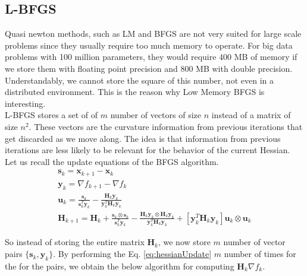 \documentclass[a4paper,10pt]{article}
\theoremstyle{definition}
\begin{document}
\subsection{L-BFGS}
Quasi newton methods, such as LM and BFGS are not very suited for large scale problems since they usually require too much memory to operate. For big data problems with 100 million parameters, they would require 400 MB of memory if we store them with floating point precision and 800 MB with double precision. Understandably, we cannot store the square of this number, not even in a distributed environment. This is the reason why Low Memory BFGS is interesting. \\

L-BFGS stores a set of of $m$ number of vectors of size $n$ instead of a matrix of size $n^2$. These vectors are the curvature information from previous iterations that get discarded as we move along. The idea is that information from previous iterations are less likely to be relevant for the behavior of the current Hessian. Let us recall the update equations of the BFGS algorithm.
\begin{gather}
	\pmb{s}_k = \pmb{x}_{k+1} - \pmb{x}_{k}\\
	\pmb{y}_k = \nabla f_{k+1} - \nabla f_k\\
	\pmb{u}_k = \frac{\pmb{s}_k}{\pmb{s}_k^T \pmb{y}_k} - \frac{\pmb{H}_k \pmb{y}_k}{\pmb{y}_k^T \pmb{H}_k \pmb{y}_k}\\
	\pmb{H}_{k+1} = \pmb{H}_k + \frac{\pmb{s}_k \otimes \pmb{s}_k}{\pmb{s}_k^T \pmb{y}_k} - \frac{\pmb{H}_k\pmb{y}_k \otimes \pmb{H}_k\pmb{y}_k}{\pmb{y}_k^T \pmb{H}_k\pmb{y}_k} + [\pmb{y}_k^T \pmb{H}_k\pmb{y}_k] \pmb{u}_k \otimes \pmb{u}_k
	\label{eq:hessianUpdate}
\end{gather}

So instead of storing the entire matrix $\pmb{H}_k$, we now store $m$ number of vector pairs $\{\pmb{s}_k, \pmb{y}_k\}$. By performing the Eq. \ref{eq:hessianUpdate} $m$ number of times for the for the pairs, we obtain the below algorithm for computing $\pmb{H}_k \nabla f_k$.
\end{document}
